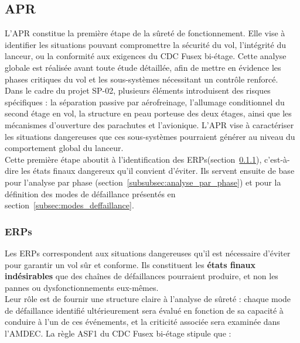 \subsection{\acrlong{APR}}
\label{subsec:analyse_prelem}

L’\acrfull{APR} constitue la première étape de la sûreté de fonctionnement. Elle vise à identifier les situations pouvant
compromettre la sécurité du vol, l’intégrité du lanceur, ou la conformité aux exigences du \acrshort{CDC} \gls{Fusex} bi-étage.
Cette analyse globale est réalisée avant toute étude détaillée, afin de mettre en évidence les phases critiques du vol et les
sous-systèmes nécessitant un contrôle renforcé.\\

Dans le cadre du projet SP-02, plusieurs éléments introduisent des risques spécifiques : la séparation passive par aérofreinage,
l’allumage conditionnel du second étage en vol, la structure en peau porteuse des deux étages, ainsi que les mécanismes
d’ouverture des parachutes et l’avionique. L’\acrshort{APR} vise à caractériser les situations dangereuses que ces sous-systèmes
pourraient générer au niveau du comportement global du lanceur.\\

Cette première étape aboutit à l’identification des \acrfull{ERPs}(section~\ref{subsubsec:ERPs}), c’est-à-dire les états finaux
dangereux qu’il convient d’éviter. Ils servent ensuite de base pour l’analyse par phase
(section~\ref{subsubsec:analyse_par_phase}) et pour la définition des modes de défaillance présentés en
section~\ref{subsec:modes_deffaillance}.

\subsubsection{\acrlong{ERPs}}
\label{subsubsec:ERPs}

Les \acrfull{ERPs} correspondent aux situations dangereuses qu’il est nécessaire d’éviter pour garantir un vol sûr et conforme.
Ils constituent les \textbf{états finaux indésirables} que des chaînes de défaillances pourraient produire, et non les pannes ou
dysfonctionnements eux-mêmes.\\

Leur rôle est de fournir une structure claire à l’analyse de sûreté : chaque mode de défaillance identifié ultérieurement sera
évalué en fonction de sa capacité à conduire à l’un de ces événements, et la criticité associée sera examinée dans
l’\acrshort{AMDEC}. La règle ASF1 du \acrshort{CDC} Fusex bi-étage stipule que :

